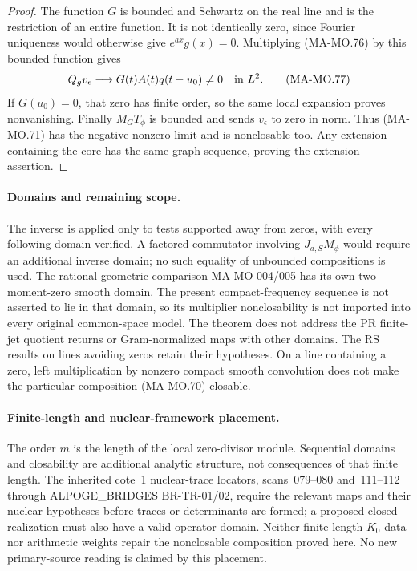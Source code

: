 \begin{proof}
The function \(G\) is bounded and Schwartz on the real
line and is the restriction of an entire function. It is
not identically zero, since Fourier uniqueness would
otherwise give \(e^{ax}g(x)=0\). Multiplying (MA-MO.76)
by this bounded function gives
\[
 Q_gv_\epsilon\longrightarrow G(t)A(t)q(t-u_0)\ne0
                                      \quad\hbox{in }L^2.
 \tag{MA-MO.77}
\]
If \(G(u_0)=0\), that zero has finite order, so the same
local expansion proves nonvanishing. Finally \(M_GT_\phi\)
is bounded and sends \(v_\epsilon\) to zero in norm.
Thus (MA-MO.71) has the negative nonzero limit and is
nonclosable too. Any extension containing the core has
the same graph sequence, proving the extension assertion.
\end{proof}

\paragraph{Domains and remaining scope.}
The inverse is applied only to tests supported away from
zeros, with every following domain verified. A factored
commutator involving \(J_{a,S}M_\phi\) would require an
additional inverse domain; no such equality of unbounded
compositions is used. The rational geometric comparison
MA-MO-004/005 has its own two-moment-zero smooth domain.
The present compact-frequency sequence is not asserted
to lie in that domain, so its multiplier nonclosability
is not imported into every original common-space model.
The theorem does not address the PR finite-jet quotient
returns or Gram-normalized maps with other domains.
The RS results on lines avoiding zeros retain their
hypotheses. On a line containing a zero, left multiplication
by nonzero compact smooth convolution does not make the
particular composition (MA-MO.70) closable.

\paragraph{Finite-length and nuclear-framework placement.}
The order \(m\) is the length of the local zero-divisor
module. Sequential domains and closability are additional
analytic structure, not consequences of that finite length.
The inherited cote~1 nuclear-trace locators, scans~079--080
and~111--112 through ALPOGE\_BRIDGES BR-TR-01/02, require
the relevant maps and their nuclear hypotheses before
traces or determinants are formed; a proposed closed
realization must also have a valid operator domain.
Neither finite-length \(K_0\) data nor arithmetic weights
repair the nonclosable composition proved here. No new
primary-source reading is claimed by this placement.
